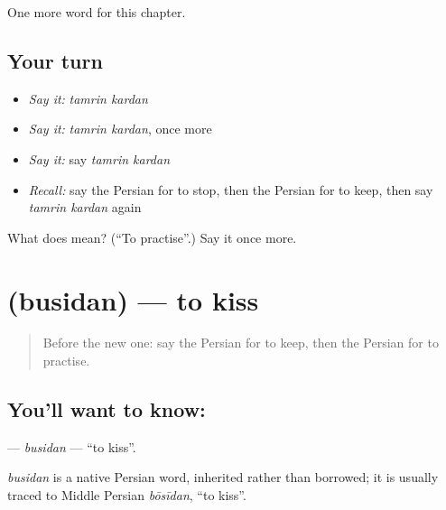 \begin{grammarlens}[title={What you've built}]
One more word for this chapter.
\end{grammarlens}

\subsection*{Your turn}
\begin{itemize}
\raggedright
  \item \emph{Say it:} \emph{tamrin kardan}
  \item \emph{Say it:} \emph{tamrin kardan}, once more
  \item \emph{Say it:} say \emph{tamrin kardan}
  \item \emph{Recall:} say the Persian for to stop, then the Persian for to keep, then say \emph{tamrin kardan} again
\end{itemize}

\begin{tcolorbox}[breakable,colback=teal!4,colframe=teal!35!black,title={Before you move on}]
What does   mean? (\textquotedblleft{}To practise\textquotedblright{}.) Say it once more.
\end{tcolorbox}
\section[\texorpdfstring{\fa{بوسیدن} (busidan)}{بوسیدن (busidan)}]{ (busidan) — to kiss}

\label{lesson:FA-C219-busidan}



\begin{quote}
Before the new one: say the Persian for to keep, then the Persian for to practise.
\end{quote}

\subsection*{You'll want to know: }
\textbf{} — \emph{busidan} — \textquotedblleft{}to kiss\textquotedblright{}.

\begin{cousinweb}
\emph{busidan} is a native Persian word, inherited rather than borrowed; it is usually traced to Middle Persian \emph{bōsīdan}, \textquotedblleft{}to kiss\textquotedblright{}.
\end{cousinweb}

